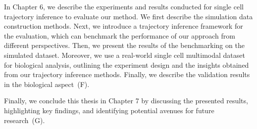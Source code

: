 In Chapter 6, we describe the experiments and results conducted for single cell trajectory inference to evaluate our method. We first describe the simulation data construction methods. Next, we introduce a trajectory inference framework for the evaluation, which can benchmark the performance of our approach from different perspectives. Then, we present the results of the benchmarking on the simulated dataset. Moreover, we use a real-world single cell multimodal dataset for biological analysis, outlining the experiment design and the insights obtained from our trajectory inference methods. Finally, we describe the validation results in the biological aspect~(F).

Finally, we conclude this thesis in Chapter 7 by discussing the presented results, highlighting key findings, and identifying potential avenues for future research~(G).
